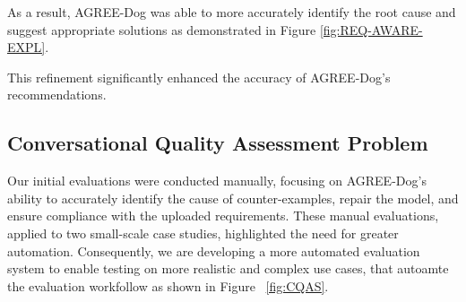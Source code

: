 As a result, AGREE-Dog was able to more accurately identify the root cause and suggest appropriate solutions as demonstrated in Figure \ref{fig:REQ-AWARE-EXPL}.


This refinement significantly enhanced the accuracy of AGREE-Dog’s recommendations.


\subsection{Conversational Quality Assessment Problem}
 
Our initial evaluations were conducted manually, focusing on AGREE-Dog's ability to accurately identify the cause of counter-examples, repair the model, and ensure compliance with the uploaded requirements. These manual evaluations, applied to two small-scale case studies, highlighted the need for greater automation. Consequently, we are developing a more automated evaluation system to enable testing on more realistic and complex use cases, that autoamte the evaluation workfollow as shown in Figure ~\ref{fig:CQAS}.
 

